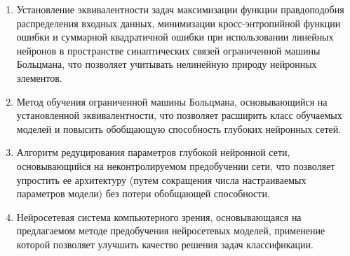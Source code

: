 \begin{enumerate}[wide, labelindent=10mm]
	\item Установление эквивалентности задач максимизации функции правдоподобия распределения входных данных, минимизации кросс-энтропийной функции ошибки и суммарной квадратичной ошибки при использовании линейных нейронов в пространстве синаптических связей ограниченной машины Больцмана, что позволяет учитывать нелинейную природу нейронных элементов.
	\item Метод обучения ограниченной машины Больцмана, основывающийся на установленной эквивалентности, что позволяет расширить класс обучаемых моделей и повысить обобщающую способность глубоких нейронных сетей.
	\item Алгоритм редуцирования параметров глубокой нейронной сети, основывающийся на неконтролируемом предобучении сети, что позволяет упростить ее архитектуру (путем сокращения числа настраиваемых параметров модели) без потери обобщающей способности.
	\item Нейросетевая система компьютерного зрения, основывающаяся на предлагаемом методе предобучения нейросетевых моделей, применение которой позволяет улучшить качество решения задач классификации. 

\end{enumerate}
